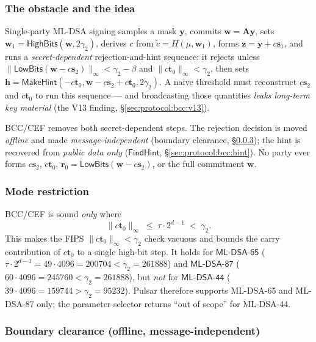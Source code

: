 \subsubsection{The obstacle and the idea}

Single-party ML-DSA signing samples a mask $\mathbf{y}$, commits
$\mathbf{w} = \mathbf{A}\mathbf{y}$, sets $\mathbf{w}_1 =
\mathsf{HighBits}(\mathbf{w}, 2\gamma_2)$, derives $c$ from $\tilde c =
H(\mu, \mathbf{w}_1)$, forms $\mathbf{z} = \mathbf{y} + c\mathbf{s}_1$,
and runs a \emph{secret-dependent} rejection-and-hint sequence: it
rejects unless $\|\mathsf{LowBits}(\mathbf{w} - c\mathbf{s}_2)\|_\infty <
\gamma_2 - \beta$ and $\|c\mathbf{t}_0\|_\infty < \gamma_2$, then sets
$\mathbf{h} = \mathsf{MakeHint}(-c\mathbf{t}_0, \mathbf{w} - c\mathbf{s}_2
+ c\mathbf{t}_0, 2\gamma_2)$. A naive threshold must reconstruct
$c\mathbf{s}_2$ and $c\mathbf{t}_0$ to run this sequence --- and
broadcasting those quantities \emph{leaks long-term key material}
(the V13 finding, \S\ref{sec:protocol:bcc:v13}).

BCC/CEF removes both secret-dependent steps. The rejection decision is
moved \emph{offline} and made \emph{message-independent} (boundary
clearance, \S\ref{sec:protocol:bcc:clear}); the hint is recovered from
\emph{public data only} ($\mathsf{FindHint}$, \S\ref{sec:protocol:bcc:hint}).
No party ever forms $c\mathbf{s}_2$, $c\mathbf{t}_0$, $\mathbf{r}_0 =
\mathsf{LowBits}(\mathbf{w} - c\mathbf{s}_2)$, or the full commitment
$\mathbf{w}$.

\subsubsection{Mode restriction}
\label{sec:protocol:bcc:mode}

BCC/CEF is sound \emph{only} where
\[
  \|c\mathbf{t}_0\|_\infty \;\leq\; \tau \cdot 2^{d-1} \;<\; \gamma_2 .
\]
This makes the FIPS $\|c\mathbf{t}_0\|_\infty < \gamma_2$ check vacuous
and bounds the carry contribution of $c\mathbf{t}_0$ to a single
high-bit step. It holds for $\mathsf{ML\text{-}DSA\text{-}65}$
($\tau\cdot 2^{d-1} = 49 \cdot 4096 = 200704 < \gamma_2 = 261888$) and
$\mathsf{ML\text{-}DSA\text{-}87}$ ($60 \cdot 4096 = 245760 < \gamma_2 =
261888$), but \emph{not} for $\mathsf{ML\text{-}DSA\text{-}44}$
($39 \cdot 4096 = 159744 > \gamma_2 = 95232$). Pulsar therefore supports
ML-DSA-65 and ML-DSA-87 only; the parameter selector returns
``out of scope'' for ML-DSA-44.

\subsubsection{Boundary clearance (offline, message-independent)}
\label{sec:protocol:bcc:clear}

